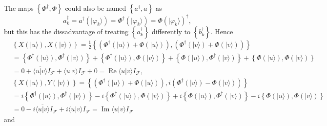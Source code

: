 \documentclass[aps, preprint]{revtex4}
\begin{document}
The maps $\left \{\Phi ^{ \dag } ,\Phi \right \}$ could also be named $\left \{a^{ \dag } ,a\right \}$ as
\begin{equation}a_{k}^{ \dag } =a^{ \dag } \left (\vert \varphi _{k} \rangle \right ) =\Phi ^{ \dag } \left (\vert \varphi _{k} \rangle \right ) =\Phi  \left (\vert \varphi _{k} \rangle \right )^{ \dag }\text{,}
\end{equation}but this has the dissadvantage of treating $\left \{a_{k}^{ \dag }\right \}$ differently to $\left \{b_{k}^{ \dag }\right \}\text{.}$ Hence
\begin{align} & \left \{X \left (\vert u \rangle \right ) ,X \left (\vert v \rangle \right )\right \} =\frac{1}{2} \left \{\left (\Phi ^{ \dag } \left (\vert u \rangle \right ) +\Phi  \left (\vert u \rangle \right )\right ) ,\left (\Phi ^{ \dag } \left (\vert v \rangle \right ) +\Phi  \left (\vert v \rangle \right )\right )\right \} \nonumber  \\
 &  =\left \{\Phi ^{ \dag } \left (\vert u \rangle \right ) ,\Phi ^{ \dag } \left (\vert v \rangle \right )\right \} +\left \{\Phi ^{ \dag } \left (\vert u \rangle \right ) ,\Phi  \left (\vert v \rangle \right )\right \} +\left \{\Phi  \left (\vert u \rangle \right ) ,\Phi ^{ \dag } \left (\vert v \rangle \right )\right \} +\left \{\Phi  \left (\vert u \rangle \right ) ,\Phi  \left (\vert v \rangle \right )\right \} \nonumber  \\
 &  =0 +\overline{ \langle \left .u\right \vert v \rangle } I_{\mathcal{F}} + \langle \left .u\right \vert v \rangle  I_{\mathcal{F}} +0 =\ensuremath{\operatorname*{Re}}  \langle \left .u\right \vert v \rangle  I_{\mathcal{F}}\text{,}\end{align}
\begin{align} & \left \{X \left (\vert u \rangle \right ) ,Y \left (\vert v \rangle \right )\right \} =\left \{\left (\Phi ^{ \dag } \left (\vert u \rangle \right ) +\Phi  \left (\vert u \rangle \right )\right ) ,i \left (\Phi ^{ \dag } \left (\vert v \rangle \right ) -\Phi  \left (\vert v \rangle \right )\right )\right \} \nonumber  \\
 &  =i \left \{\Phi ^{ \dag } \left (\vert u \rangle \right ) ,\Phi ^{ \dag } \left (\vert v \rangle \right )\right \} -i \left \{\Phi ^{ \dag } \left (\vert u \rangle \right ) ,\Phi  \left (\vert v \rangle \right )\right \} +i \left \{\Phi  \left (\vert u \rangle \right ) ,\Phi ^{ \dag } \left (\vert v \rangle \right )\right \} -i \left \{\Phi  \left (\vert u \rangle \right ) ,\Phi  \left (\vert v \rangle \right )\right \} \nonumber  \\
 &  =0 -i \overline{ \langle \left .u\right \vert v \rangle } I_{\mathcal{F}} +i  \langle \left .u\right \vert v \rangle  I_{\mathcal{F}} =\ensuremath{\operatorname*{Im}}  \langle \left .u\right \vert v \rangle  I_{\mathcal{F}}\end{align}and
\end{document}
